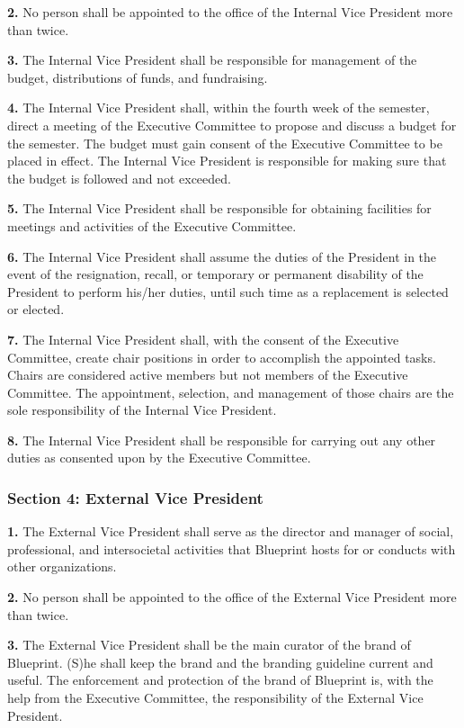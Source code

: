 \documentclass{article}
\begin{document}
\textbf{2.} No person shall be appointed to the office of the Internal Vice President more than twice.

\textbf{3.} The Internal Vice President shall be responsible for management of the budget, distributions of funds, and fundraising.

\textbf{4.} The Internal Vice President shall, within the fourth week of the semester, direct a meeting of the Executive Committee to propose and discuss a budget for the semester. The budget must gain consent of the Executive Committee to be placed in effect. The Internal Vice President is responsible for making sure that the budget is followed and not exceeded.

\textbf{5.} The Internal Vice President shall be responsible for obtaining facilities for meetings and activities of the Executive Committee.

\textbf{6.} The Internal Vice President shall assume the duties of the President in the event of the resignation, recall, or temporary or permanent disability of the President to perform his/her duties, until such time as a replacement is selected or elected.

\textbf{7.} The Internal Vice President shall, with the consent of the Executive Committee, create chair positions in order to accomplish the appointed tasks. Chairs are considered active members but not members of the Executive Committee. The appointment, selection, and management of those chairs are the sole responsibility of the Internal Vice President.

\textbf{8.} The Internal Vice President shall be responsible for carrying out any other duties as consented upon by the Executive Committee.

\subsubsection{Section 4: External Vice President}

\textbf{1.} The External Vice President shall serve as the director and manager of social, professional, and intersocietal activities that Blueprint hosts for or conducts with other organizations. 

\textbf{2.} No person shall be appointed to the office of the External Vice President more than twice.

\textbf{3.} The External Vice President shall be the main curator of the brand of Blueprint. (S)he shall keep the brand and the branding guideline current and useful. The enforcement and protection of the brand of Blueprint is, with the help from the Executive Committee, the responsibility of the External Vice President.
\end{document}
